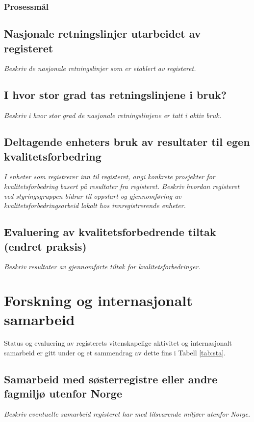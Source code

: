 \documentclass[norsk, a4paper, twocolumn]{report}
\begin{document}
\subsection{Prosessmål}

\section{Nasjonale retningslinjer utarbeidet av registeret}\label{sec:nasret}
\textit{Beskriv de nasjonale retningslinjer som er etablert av registeret.}

\section{I hvor stor grad tas retningslinjene i bruk?}\label{sec:retbru}
\textit{Beskriv i hvor stor grad de nasjonale retningslinjene er tatt i
aktiv bruk.}

\section{Deltagende enheters bruk av resultater til egen kvalitetsforbedring}\label{sec:brures}
\textit{I enheter som registrerer inn til registeret, angi konkrete prosjekter
for kvalitetsforbedring basert på resultater fra registeret. Beskriv
hvordan registeret ved styringsgruppen bidrar til oppstart og gjennomføring
av kvalitetsforbedringsarbeid lokalt hos innregistrerende enheter.}

\section{Evaluering av kvalitetsforbedrende tiltak (endret praksis)}\label{sec:evakva}
\textit{Beskriv resultater av gjennomførte tiltak for kvalitetsforbedringer.}

\chapter{Forskning og internasjonalt samarbeid}\label{cha:for}
Status og evaluering av registerets vitenskapelige aktivitet og internasjonalt
samarbeid er gitt under og et sammendrag av dette fins i Tabell \ref{tab:sta}.

\section{Samarbeid med søsterregistre eller andre fagmiljø utenfor Norge}\label{sec:samfag}
\textit{Beskriv eventuelle samarbeid registeret har med tilsvarende miljøer
utenfor Norge.}
\end{document}

